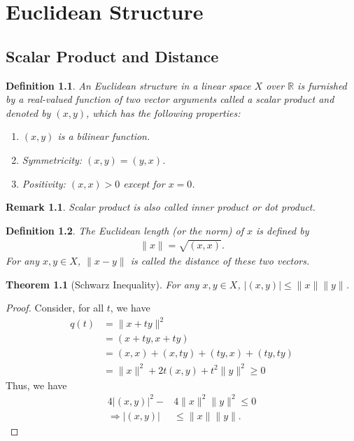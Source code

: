 \documentclass[11pt]{book}
\newtheorem{definition}{Definition}[section]
\newtheorem{theorem}{Theorem}[section]
\newtheorem{remark}{Remark}[section]
\theoremstyle{definition}
\numberwithin{equation}{chapter}
\begin{document}
\medskip

\chapter{Euclidean Structure}\label{chapter_7}
\section{Scalar Product and Distance}
\begin{definition}
An Euclidean structure in a linear space $X$ over $\mathbb{R}$ is furnished by a real-valued function of two vector arguments called a scalar product and denoted by $(x,y)$, which has the following properties:
\begin{enumerate}[label=(\arabic*)]
    \item $(x,y)$ is a bilinear function.
    \item Symmetricity: $(x,y) = (y,x)$.
    \item Positivity: $(x,x) > 0$ except for $x = 0$. 
\end{enumerate}
\end{definition}
\begin{remark}
Scalar product is also called inner product or dot product.
\end{remark}

\medskip

\begin{definition}
The Euclidean length (or the norm) of $x$ is defined by 
\begin{align*}
    \|x\| = \sqrt{(x,x)}.
\end{align*}
For any $x,y\in X$, $\|x- y\|$ is called the distance of these two vectors.
\end{definition}

\medskip

\begin{theorem}[Schwarz Inequality]
For any $x,y\in X$, $\left|(x,y)\right| \leq \|x\| \|y\|$.
\end{theorem}
\begin{proof}
Consider, for all $t$, we have
\begin{align*}
    q(t) & = \|x+ty\|^2 \\
    & = (x+ty,x+ty) \\
    & = (x,x) + (x,ty) + (ty,x) + (ty,ty) \\
    & = \|x\|^2 + 2t (x,y) + t^2 \|y\|^2  \geq 0
\end{align*}
Thus, we have 
\begin{align*}
    4\left|(x,y)\right|^2 - & 4 \|x\|^2 \|y\|^2 \leq 0 \\
    \Rightarrow \left|(x,y)\right| & \leq \|x\| \|y\|.
\end{align*}
\end{proof}
\end{document}
